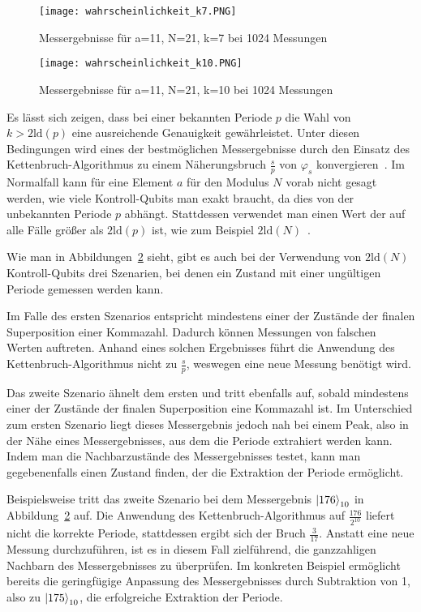 \begin{figure} [H]
    \caption{Messergebnisse für a=11, N=21, k=7 bei 1024 Messungen}
    \label{fig:Messung7k}
    \texttt{[image: wahrscheinlichkeit\_k7.PNG]}
    \centering
    \end{figure}
\begin{figure} [H]
    \caption{Messergebnisse für a=11, N=21, k=10 bei 1024 Messungen}
    \label{fig:Messung10k}
    \texttt{[image: wahrscheinlichkeit\_k10.PNG]}
    \centering
    \end{figure}

Es lässt sich zeigen, dass bei einer bekannten Periode \(p\) die Wahl von \(k > 2\text{ld}(p)\) 
eine ausreichende Genauigkeit gewährleistet. 
Unter diesen Bedingungen wird eines der bestmöglichen Messergebnisse durch den Einsatz des Kettenbruch-Algorithmus zu einem Näherungsbruch \(\frac{s}{p}\) von \(\varphi_s\) konvergieren~\cite{Shor_1997}.
Im Normalfall kann für eine Element \(a\) für den Modulus \(N\) vorab nicht gesagt werden, 
wie viele Kontroll-Qubits man exakt braucht, 
da dies von der unbekannten Periode \(p\) abhängt.
Stattdessen verwendet man einen Wert der auf alle Fälle größer als \(2\text{ld}(p)\) ist, 
wie zum Beispiel \(2\text{ld}(N)\)~\cite{Shor_1997,mosca1999hidden}. 

Wie man in Abbildungen~\ref{fig:Messung10k} sieht, 
gibt es auch bei der Verwendung von \(2\text{ld}(N)\) Kontroll-Qubits drei Szenarien, 
bei denen ein Zustand mit einer ungültigen Periode gemessen werden kann.

Im Falle des ersten Szenarios 
entspricht mindestens einer der Zustände der finalen Superposition einer Kommazahl.
Dadurch können Messungen von falschen Werten auftreten.
Anhand eines solchen Ergebnisses führt die Anwendung des Kettenbruch-Algorithmus nicht zu \(\frac{s}{p}\), 
weswegen eine neue Messung benötigt wird.

Das zweite Szenario ähnelt dem ersten und tritt ebenfalls auf, 
sobald mindestens einer der Zustände der finalen Superposition eine Kommazahl ist. 
Im Unterschied zum ersten Szenario liegt dieses Messergebnis jedoch nah bei einem Peak, 
also in der Nähe eines Messergebnisses, aus dem die Periode extrahiert werden kann. 
Indem man die Nachbarzustände des Messergebnisses testet, kann man gegebenenfalls einen Zustand finden, 
der die Extraktion der Periode ermöglicht.

Beispielsweise tritt das zweite Szenario bei dem Messergebnis \(\ket{176}_{10}\) in Abbildung~\ref{fig:Messung10k} auf.
Die Anwendung des Kettenbruch-Algorithmus auf \(\frac{176}{2^{10}}\) 
liefert nicht die korrekte Periode, stattdessen ergibt sich der Bruch \(\frac{3}{17}\). 
Anstatt eine neue Messung durchzuführen,
ist es in diesem Fall zielführend, 
die ganzzahligen Nachbarn des Messergebnisses zu überprüfen.
Im konkreten Beispiel ermöglicht bereits die geringfügige Anpassung des Messergebnisses durch Subtraktion von 1, 
also zu \(\ket{175}_{10}\), 
die erfolgreiche Extraktion der Periode.

